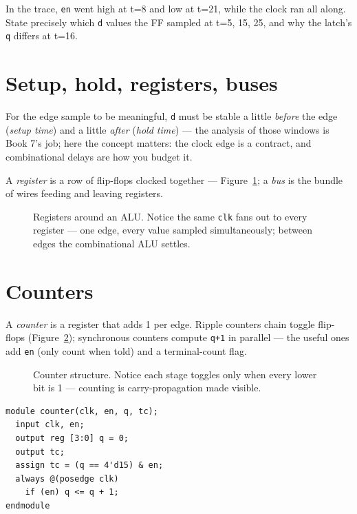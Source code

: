 \begin{exercise}[medium]
In the trace, \texttt{en} went high at t=8 and low at t=21, while the
clock ran all along. State precisely which \texttt{d} values the FF
sampled at t=5, 15, 25, and why the latch's \texttt{q} differs at t=16.
\end{exercise}

\section{Setup, hold, registers, buses}
\label{sec:setup}

For the edge sample to be meaningful, \texttt{d} must be stable a
little \emph{before} the edge (\emph{setup
time}) and a little \emph{after} (\emph{hold
time}) — the analysis of those windows is Book 7's
job; here the concept matters: the clock edge is a contract, and
combinational delays are how you budget it.

A \emph{register} is a row of flip-flops clocked
together — Figure~\ref{fig:register}; a \emph{bus} is the bundle of
wires feeding and leaving registers.

\begin{figure}[htbp]
\centering

\caption{Registers around an ALU. Notice the same \texttt{clk} fans
out to every register — one edge, every value sampled simultaneously;
between edges the combinational ALU settles.}
\label{fig:register}
\end{figure}

\section{Counters}
\label{sec:counters}

A \emph{counter} is a register that adds 1 per edge.
Ripple counters chain toggle flip-flops (Figure~\ref{fig:counter});
synchronous counters compute \texttt{q+1} in parallel — the useful
ones add \texttt{en} (only count when told) and a terminal-count flag.

\begin{figure}[htbp]
\centering

\caption{Counter structure. Notice each stage toggles only when every
lower bit is 1 — counting is carry-propagation made visible.}
\label{fig:counter}
\end{figure}

\begin{lstlisting}[caption={\ttfamily code/ch10\_counter.v ---
enable + terminal count.},label={lst:counter},abovecaptionskip=0pt]
module counter(clk, en, q, tc);
  input clk, en;
  output reg [3:0] q = 0;
  output tc;
  assign tc = (q == 4'd15) & en;
  always @(posedge clk)
    if (en) q <= q + 1;
endmodule
\end{lstlisting}

